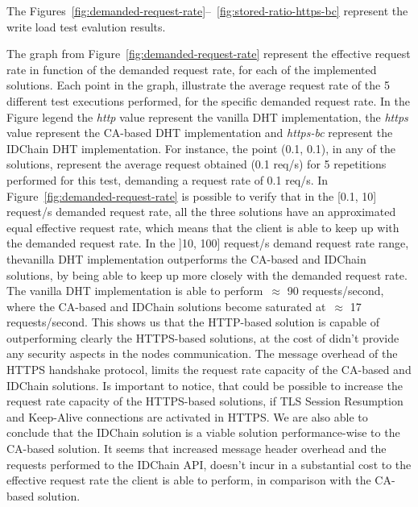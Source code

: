 The Figures~\ref{fig:demanded-request-rate}–~\ref{fig:stored-ratio-https-bc} represent the write load test evalution results.

The graph from Figure~\ref{fig:demanded-request-rate} represent the effective request rate in function of the demanded request rate, for each of the implemented solutions.
Each point in the graph, illustrate the average request rate of the 5 different test executions performed, for the specific demanded request rate.
In the Figure legend the \textit{http} value represent the vanilla DHT implementation, the \textit{https} value represent the CA-based DHT implementation and \textit{https-bc} represent the IDChain DHT implementation.
For instance, the point (0.1, 0.1), in any of the solutions, represent the average request obtained (0.1 req/s) for 5 repetitions performed for this test, demanding a request rate of 0.1 req/s.
In Figure~\ref{fig:demanded-request-rate} is possible to verify that in the [0.1, 10] request/s demanded request rate, all the three solutions have an approximated equal effective request rate, which means that the client is able to keep up with the demanded request rate.
In the ]10, 100] request/s demand request rate range, thevanilla DHT implementation outperforms the CA-based and IDChain solutions, by being able to keep up more closely with the demanded request rate.
The vanilla DHT implementation is able to perform~$\approx$ 90 requests/second, where the CA-based and IDChain solutions become saturated at~$\approx$ 17 requests/second.
This shows us that the HTTP-based solution is capable of outperforming clearly the HTTPS-based solutions, at the cost of didn't provide any security aspects in the nodes communication.
The message overhead of the HTTPS handshake protocol, limits the request rate capacity of the CA-based and IDChain solutions.
Is important to notice, that could be possible to increase the request rate capacity of the HTTPS-based solutions, if TLS Session Resumption and Keep-Alive connections are activated in HTTPS.
We are also able to conclude that the IDChain solution is a viable solution performance-wise to the CA-based solution.
It seems that increased message header overhead and the requests performed to the IDChain API, doesn't incur in a substantial cost to the effective request rate the client is able to perform, in comparison with the CA-based solution.

